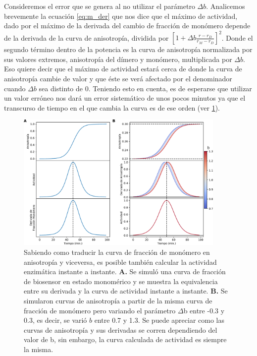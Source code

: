 Consideremos el error que se genera al no utilizar el parámetro $\Delta b$. Analicemos brevemente la ecuación \ref{eq:m_der} que nos dice que el máximo de actividad, dado por el máximo de la derivada del cambio de fracción de monómero depende de la derivada de la curva de anisotropía, dividida por $\left[1 + \Delta b \frac{r - r_D}{r_M - r_D}\right]^2$. Donde el segundo término dentro de la potencia es la curva de anisotropía normalizada por sus valores extremos, anisotropía del dímero y monómero, multiplicada por $\Delta b$. Eso quiere decir que el máximo de actividad estará cerca de donde la curva de anisotropía cambie de valor y que éste se verá afectado por el denominador cuando $\Delta b$ sea distinto de 0. Teniendo esto en cuenta, es de esperarse que utilizar un valor erróneo nos dará un error sistemático de unos pocos minutos ya que el transcurso de tiempo en el que cambia la curva es de ese orden (ver \cref{fig:sweep_b}).

\begin{figure}[htb]
    \centering
    \includegraphics[width=0.9\textwidth]{img/cap_2/sweep_b_mono_ders.pdf}
    \caption{\footnotesize{Sabiendo como traducir la curva de fracción de monómero en anisotropía y viceversa, es posible también calcular la actividad enzimática instante a instante. \textbf{A.} Se simuló una curva de fracción de biosensor en estado monomérico y se muestra la equivalencia entre su derivada y la curva de actividad instante a instante. \textbf{B.} Se simularon curvas de anisotropía a partir de la misma curva de fracción de monómero pero variando el parámetro $\Delta$b entre -0.3 y 0.3, es decir, se varió $b$ entre 0.7 y 1.3. Se puede apreciar como las curvas de anisotropía y sus derivadas se corren dependiendo del valor de b, sin embargo, la curva calculada de actividad es siempre la misma.}}
    \label{fig:sweep_b}
\end{figure}


